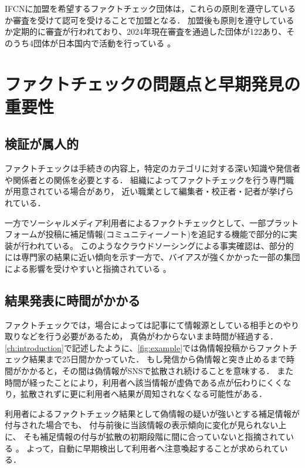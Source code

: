 IFCNに加盟を希望するファクトチェック団体は，これらの原則を遵守しているか審査を受けて認可を受けることで加盟となる．
加盟後も原則を遵守しているか定期的に審査が行われており、2024年現在審査を通過した団体が122あり、そのうち4団体が日本国内で活動を行っている \cite{IFCNCoP}。



\section{ファクトチェックの問題点と早期発見の重要性}
\subsection{検証が属人的}
ファクトチェックは手続きの内容上，特定のカテゴリに対する深い知識や発信者や関係者との関係を必要とする．
組織によってファクトチェックを行う専門職が用意されている場合があり，
近い職業として編集者・校正者・記者が挙げられている\cite{deahl_2019}．

一方でソーシャルメディア利用者によるファクトチェックとして、一部プラットフォームが投稿に補足情報(コミュニティーノート)を追記する機能で部分的に実装が行われている。
このようなクラウドソーシングによる事実確認は、部分的には専門家の結果に近い傾向を示す一方で、バイアスが強くかかった一部の集団による影響を受けやすいと指摘されている \cite{10.1145/3511808.3557279}。

\subsection{結果発表に時間がかかる}
ファクトチェックでは，場合によっては記事にて情報源としている相手とのやり取りなどを行う必要があるため，
真偽がわからないまま時間が経過する．
\cref{ch:introduction}で記述したように、\cref{fig:example}では偽情報投稿からファクトチェック結果まで25日間かかっていた．
もし発信から偽情報と突き止めるまで時間がかかると，その間は偽情報がSNSで拡散され続けることを意味する．
また時間が経ったことにより，利用者へ該当情報が虚偽である点が伝わりにくくなり，拡散されずに更に利用者へ結果が周知されなくなる可能性がある．

利用者によるファクトチェック結果として偽情報の疑いが強いとする補足情報が付与された場合でも、
付与前後に当該情報の表示傾向に変化が見られない上に、
そも補足情報の付与が拡散の初期段階に間に合っていないと指摘されている \cite{chuai2023rollout}。
よって，自動に早期検出して利用者へ注意喚起することが求められている．
